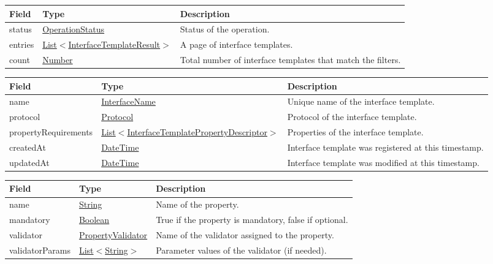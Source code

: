 \documentclass[a4paper]{arrowhead}
\newcommand{\pref}[1]{{\textcolor{ArrowheadGrey}{\hyperref[sec:model:primitives:#1]{#1}}}}
\begin{document}
\begin{table}[ht!]
\begin{tabularx}{\textwidth}{| p{2.5cm} | p{5cm} | X |} \hline
\rowcolor{gray!33} Field & Type      & Description \\ \hline
status & \pref{OperationStatus} & Status of the operation. \\ \hline
entries & \pref{List}$<$\hyperref[sec:model:InterfaceTemplateResult]{InterfaceTemplateResult}$>$ & A page of interface templates. \\ \hline
count & \pref{Number} & Total number of interface templates that match the filters. \\ \hline
\end{tabularx}
\end{table}

 
\begin{table}[ht!]
\begin{tabularx}{\textwidth}{| p{3.5cm} | p{6.8cm} | X |} \hline
\rowcolor{gray!33} Field & Type      & Description \\ \hline
name & \pref{InterfaceName} & Unique name of the interface template. \\ \hline
protocol & \pref{Protocol} & Protocol of the interface template. \\ \hline
propertyRequirements & \pref{List}$<$\hyperref[sec:model:InterfaceTemplatePropertyDescriptor]{InterfaceTemplatePropertyDescriptor}$>$ & Properties of the interface template. \\ \hline
createdAt & \pref{DateTime} & Interface template was registered at this timestamp. \\ \hline
updatedAt & \pref{DateTime} & Interface template was modified at this timestamp. \\ \hline
\end{tabularx}
\end{table}


\begin{table}[H]
\begin{tabularx}{\textwidth}{| p{2.5cm} | p{2.7cm} | X |} \hline
\rowcolor{gray!33} Field & Type      & Description \\ \hline
name & \pref{String} & Name of the property. \\ \hline
mandatory & \pref{Boolean} & True if the property is mandatory, false if optional. \\ \hline
validator & \pref{PropertyValidator} & Name of the validator assigned to the property. \\ \hline
validatorParams & \pref{List}$<$\pref{String}$>$ & Parameter values of the validator (if needed). \\ \hline
\end{tabularx}
\end{table}
\end{document}
